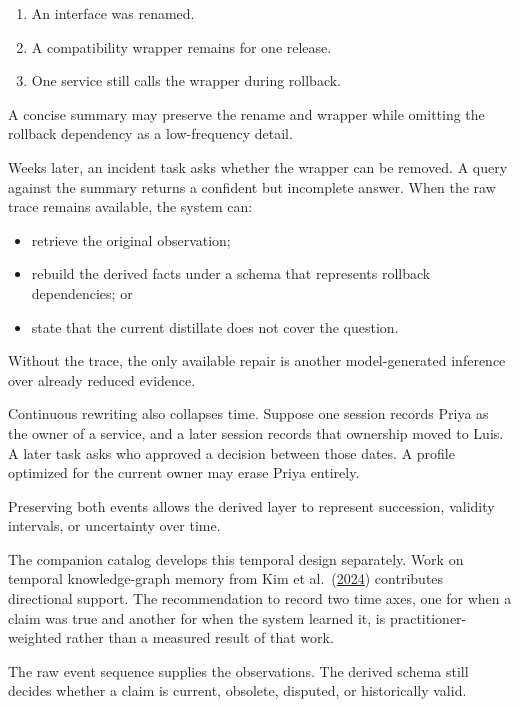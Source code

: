 \begin{enumerate}
\def\labelenumi{\arabic{enumi}.}
\tightlist
\item
  An interface was renamed.
\item
  A compatibility wrapper remains for one release.
\item
  One service still calls the wrapper during rollback.
\end{enumerate}

A concise summary may preserve the rename and wrapper while omitting the rollback dependency as a low-frequency detail.


Weeks later, an incident task asks whether the wrapper can be removed. A query against the summary returns a confident but incomplete answer. When the raw trace remains available, the system can:

\begin{itemize}
\tightlist
\item
  retrieve the original observation;
\item
  rebuild the derived facts under a schema that represents rollback dependencies; or
\item
  state that the current distillate does not cover the question.
\end{itemize}

Without the trace, the only available repair is another model-generated inference over already reduced evidence.

Continuous rewriting also collapses time. Suppose one session records Priya as the owner of a service, and a later session records that ownership moved to Luis. A later task asks who approved a decision between those dates. A profile optimized for the current owner may erase Priya entirely.

Preserving both events allows the derived layer to represent succession, validity intervals, or uncertainty over time.

The companion catalog develops this temporal design separately. Work on temporal knowledge-graph memory from Kim et al.~(\href{https://arxiv.org/abs/2408.05861}{2024}) contributes directional support. The recommendation to record two time axes, one for when a claim was true and another for when the system learned it, is practitioner-weighted rather than a measured result of that work.

The raw event sequence supplies the observations. The derived schema still decides whether a claim is current, obsolete, disputed, or historically valid.

